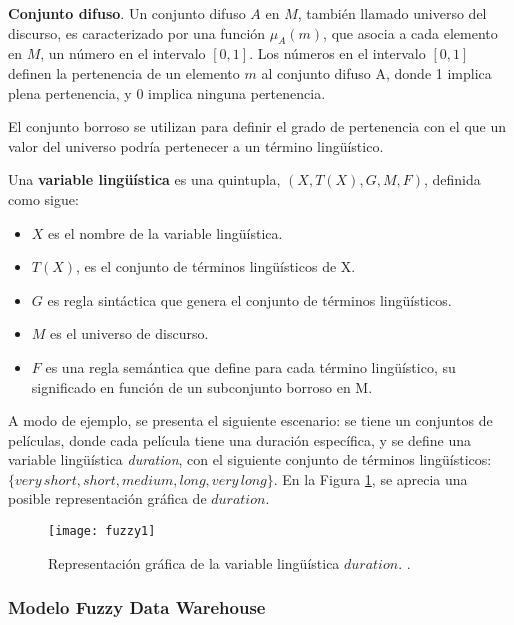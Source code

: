 \documentclass[a4paper,11pt]{article}
\begin{document}
    \textbf{Conjunto difuso}. Un conjunto difuso $A$ en $M$, también llamado universo del discurso, es caracterizado por una función
    $\mu_{A}(m)$, que asocia a cada elemento en $M$, un número en el intervalo $[0,1]$. Los números en el intervalo $[0,1]$ definen la pertenencia
    de un elemento $m$ al conjunto difuso A, donde 1 implica plena pertenencia, y 0 implica ninguna pertenencia.
    
    El conjunto borroso se utilizan para definir el grado de pertenencia con el que un valor del universo podría pertenecer a un término lingüístico.
    
    Una \textbf{variable lingüística} es una quintupla, $(X, T(X), G, M, F)$, definida como sigue:
        
    \begin{itemize}
      \item $X$ es el nombre de la variable lingüística.
      \item $T(X)$, es el conjunto de términos lingüísticos de X.
      \item $G$ es regla sintáctica que genera el conjunto de términos lingüísticos.
      \item $M$ es el universo de discurso.
      \item $F$ es una regla semántica que define para cada término lingüístico, su significado en función de un subconjunto borroso en M.
    \end{itemize}
    
    A modo de ejemplo, se presenta el siguiente escenario: se tiene un conjuntos de películas, donde cada película tiene una duración específica, y se define una
    variable lingüística \textit{duration}, con el siguiente conjunto de términos lingüísticos: $\{ very\,short, short, medium, long, very\,long \}$.
    En la Figura \ref{ejVarLinguistica}, se aprecia una posible representación gráfica de $duration$.
    
    \begin{figure}
      \begin{center}
        \texttt{[image: fuzzy1]}
        \caption{Representación gráfica de la variable lingüística $duration$. \cite[p.~39]{Fasel14}.}
        \label{ejVarLinguistica}
      \end{center}
    \end{figure}
    
    
    \subsubsection{Modelo Fuzzy Data Warehouse} \label{MFDW}
    
\end{document}
